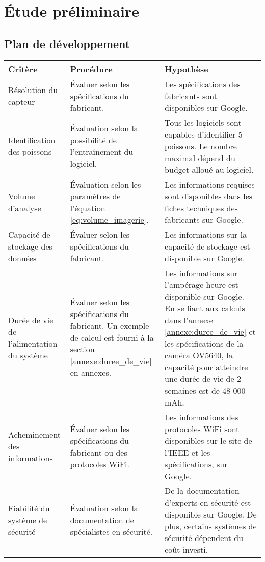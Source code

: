 
%
%

\chapter{Étude préliminaire}
\label{s:etude_preliminaire}

\section{Plan de développement}


\begin{longtable}[c]{|p{2.5cm}|p{6cm}|p{6cm}|}
        \hline
        Critère & Procédure & Hypothèse\\
        \hline
        \hline
        Résolution du capteur & Évaluer selon les spécifications du fabricant. & Les spécifications des fabricants sont disponibles sur Google.\\\hline
        Identification des poissons & Évaluation selon la possibilité de l'entraînement du logiciel. & Tous les logiciels sont capables d'identifier 5 poissons. Le nombre maximal dépend du budget alloué au logiciel. \\  \hline
        Volume d'analyse & Évaluation selon les paramètres de l'équation \ref{eq:volume_imagerie}. & Les informations requises sont disponibles dans les fiches techniques des fabricants sur Google.\\
        \hline
        Capacité de stockage des données & Évaluer selon les spécifications du fabricant. & Les informations sur la capacité de stockage est disponible sur Google.\\\hline
        Durée de vie de l'alimentation du système & Évaluer selon les spécifications du fabricant. Un exemple de calcul est fourni à la section \ref{annexe:duree_de_vie} en annexes. & Les informations sur l'ampérage-heure est disponible sur Google. En se fiant aux calculs dans l'annexe \ref{annexe:duree_de_vie} et les spécifications de la caméra OV5640, la capacité pour atteindre une durée de vie de 2 semaines est de 48 000 mAh.\\\hline
        Acheminement des informations & Évaluer selon les spécifications du fabricant ou des protocoles WiFi. & Les informations des protocoles WiFi sont disponibles sur le site de l'IEEE et les spécifications, sur Google.\\\hline
        Fiabilité du système de sécurité & Évaluation selon la documentation de spécialistes en sécurité. & De la documentation d'experts en sécurité est disponible sur Google. De plus, certains systèmes de sécurité dépendent du coût investi. \\\hline

\end{longtable}
